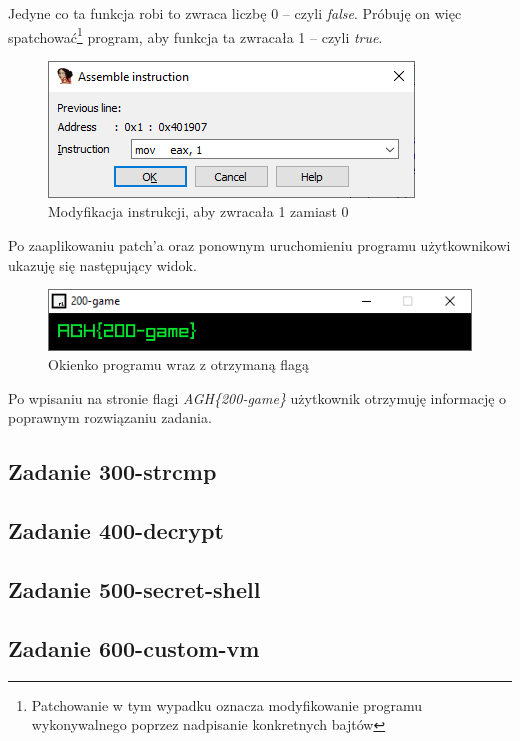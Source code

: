 \documentclass[polish,12pt]{aghthesis}
\begin{document}
Jedyne co ta funkcja robi to zwraca liczbę 0 -- czyli \emph{false}.
Próbuję on więc spatchować\footnote{Patchowanie w tym wypadku oznacza modyfikowanie programu
wykonywalnego poprzez nadpisanie konkretnych bajtów}
program, aby funkcja ta zwracała 1 -- czyli \emph{true}.

\begin{figure}[H]
    \centering
    \includegraphics{200_ida_patch}
    \caption{Modyfikacja instrukcji, aby zwracała 1 zamiast 0}
    \label{fig:200_ida_patch}
\end{figure}

Po zaaplikowaniu patch'a oraz ponownym uruchomieniu programu użytkownikowi ukazuję się
następujący widok.

\begin{figure}[H]
    \centering
    \includegraphics{200_flag}
    \caption{Okienko programu wraz z otrzymaną flagą}
    \label{fig:200_flag}
\end{figure}

Po wpisaniu na stronie flagi \emph{AGH\{200-game\}} użytkownik otrzymuję informację
o poprawnym rozwiązaniu zadania.

\clearpage

\subsection{Zadanie 300-strcmp}

\subsection{Zadanie 400-decrypt}

\subsection{Zadanie 500-secret-shell}

\subsection{Zadanie 600-custom-vm}

\clearpage


\end{document}
